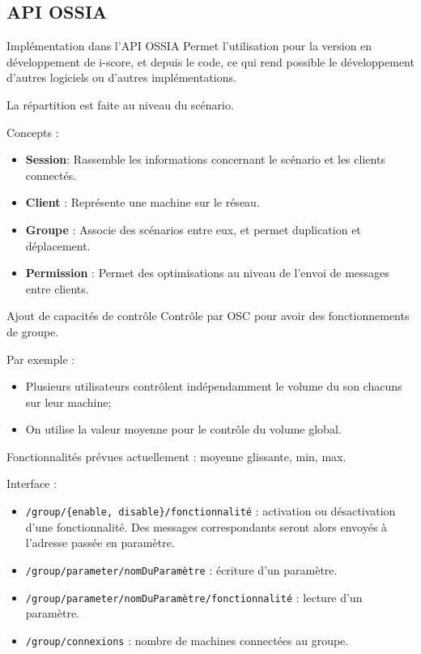 \subsection{API OSSIA}
\begin{frame}{Implémentation dans l'API OSSIA}
	Permet l'utilisation pour la version en développement de i-score, et depuis le code, ce qui rend possible le développement d'autres logiciels ou d'autres implémentations.
	
	La répartition est faite au niveau du scénario.
	
	Concepts : 
	\begin{itemize}
		\item \textbf{Session}: Rassemble les informations concernant le scénario et les clients connectés. 
		\item \textbf{Client} :  Représente une machine sur le réseau.
		\item \textbf{Groupe} :  Associe des scénarios entre eux, et permet duplication et déplacement.
		\item \textbf{Permission} :  
		Permet des optimisations au niveau de l'envoi de messages entre clients.
	\end{itemize}
\end{frame}

\begin{frame}{Ajout de capacités de contrôle}
	Contrôle par \textsc{OSC} pour avoir des fonctionnements de groupe.
	
	Par exemple : 
	\begin{itemize}
		\item Plusieurs utilisateurs contrôlent indépendamment le volume du son chacuns sur leur machine;
		\item On utilise la valeur moyenne pour le contrôle du volume global.
	\end{itemize}
		
	Fonctionnalités prévues actuellement : moyenne glissante, min, max.
	
\end{frame}

\begin{frame}
	Interface : 
	
	\begin{itemize}
		\item \texttt{/group/\{enable, disable\}/fonctionnalité} : activation ou désactivation d'une fonctionnalité. Des messages correspondants seront alors envoyés à l'adresse passée en paramètre.
		\item \texttt{/group/parameter/nomDuParamètre} : écriture d'un paramètre.
		\item \texttt{/group/parameter/nomDuParamètre/fonctionnalité} : lecture d'un paramètre.
		\item \texttt{/group/connexions} : nombre de machines connectées au groupe.
	\end{itemize}
\end{frame}

